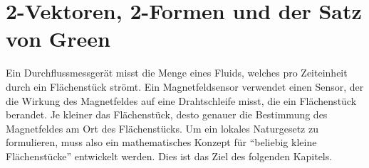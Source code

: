 %
%
%
\chapter{2-Vektoren, 2-Formen und der Satz von Green
\label{chapter:green}}
Ein Durchflussmessgerät misst die Menge eines Fluids, welches pro
Zeiteinheit durch ein Flächenstück strömt.
Ein Magnetfeldsensor verwendet einen Sensor, der die Wirkung des Magnetfeldes
auf eine Drahtschleife misst, die ein Flächenstück berandet.
Je kleiner das Flächenstück, desto genauer die Bestimmung des Magnetfeldes
am Ort des Flächenstücks.
Um ein lokales Naturgesetz zu formulieren, muss also ein mathematisches
Konzept für ``beliebig kleine Flächenstücke'' entwickelt werden.
Dies ist das Ziel des folgenden Kapitels.







\uebungsabschnitt

\begin{uebungsaufgaben}
\end{uebungsaufgaben}
\enduebungsabschnitt

